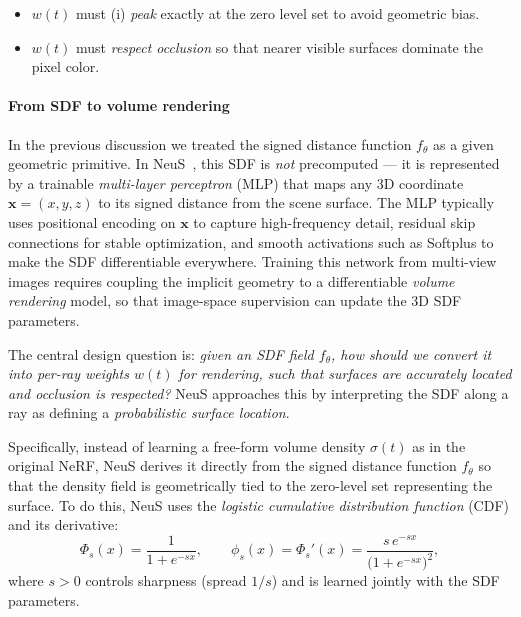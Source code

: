 \begin{enrichment}
\begin{enrichment}
        \begin{itemize}
            \item \(w(t)\) must (i) \emph{peak} exactly at the zero level set to avoid geometric bias. 
            \item  \(w(t)\) must \emph{respect occlusion} so that nearer visible surfaces dominate the pixel color.
        \end{itemize}
        
        \paragraph{From SDF to volume rendering}
        In the previous discussion we treated the signed distance function \(f_\theta\) as a given geometric primitive.  
        In NeuS~\cite{wang2021_neus}, this SDF is \emph{not} precomputed — it is represented by a trainable \emph{multi-layer perceptron} (MLP) that maps any 3D coordinate \(\mathbf{x}=(x,y,z)\) to its signed distance from the scene surface.  
        The MLP typically uses positional encoding on \(\mathbf{x}\) to capture high-frequency detail, residual skip connections for stable optimization, and smooth activations such as Softplus to make the SDF differentiable everywhere.  
        Training this network from multi-view images requires coupling the implicit geometry to a differentiable \emph{volume rendering} model, so that image-space supervision can update the 3D SDF parameters.
        
        The central design question is: \emph{given an SDF field \(f_\theta\), how should we convert it into per-ray weights \(w(t)\) for rendering, such that surfaces are accurately located and occlusion is respected?}  
        NeuS approaches this by interpreting the SDF along a ray as defining a \emph{probabilistic surface location}.  
        
        \newpage
        
        Specifically, instead of learning a free-form volume density \(\sigma(t)\) as in the original NeRF, NeuS derives it directly from the signed distance function \(f_\theta\) so that the density field is geometrically tied to the zero-level set representing the surface.  
        To do this, NeuS uses the \emph{logistic cumulative distribution function} (CDF) and its derivative:
        \[
        \Phi_s(x) = \frac{1}{1 + e^{-s x}}, 
        \qquad
        \phi_s(x) = \Phi_s'(x) = \frac{s\,e^{-s x}}{\big(1+e^{-s x}\big)^2},
        \]
        where \(s > 0\) controls sharpness (spread \(1/s\)) and is learned jointly with the SDF parameters.
        

\end{enrichment}
\end{enrichment}

